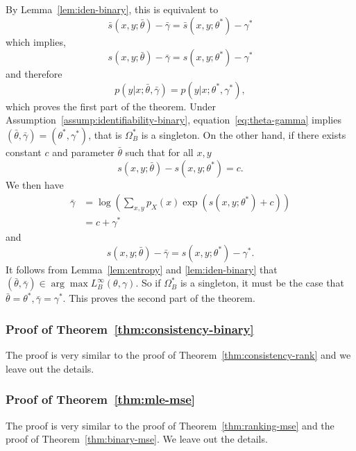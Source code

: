 \documentclass[11pt,a4paper]{article}
\newcommand{\str}[3]{s(#1, #2; #3)}
\newcommand{\ssf}[3]{\bar{s}(#1, #2; #3)}
\begin{document}
By Lemma~\ref{lem:iden-binary}, this is equivalent to 
\begin{equation}
  \ssf{x}{y}{\bar{\theta}} - \bar{\gamma} = \ssf{x}{y}{\theta^*} - \gamma^* 
\label{eq:theta-gamma}
\end{equation}
which implies, 
\begin{equation}
  \str{x}{y}{\bar{\theta}} - \bar{\gamma} = \str{x}{y}{\theta^*} - \gamma^* 
\label{eq:theta-gamma}
\end{equation}
and therefore
\[
p(y|x ; \bar{\theta}, \bar{\gamma}) = p(y|x; \theta^*, \gamma^*),
\]
which proves the first part of the theorem. Under Assumption~\ref{assump:identifiability-binary}, equation~\eqref{eq:theta-gamma} implies $(\bar{\theta}, \bar{\gamma}) = (\theta^*, \gamma^*)$, that is $\Omega_B^*$ is a singleton. On the other hand, if there exists constant $c$ and parameter $\bar{\theta}$ such that for all $x, y$
\[
\str{x}{y}{\bar{\theta}} - \str{x}{y}{\theta^*} = c. 
\]
We then have  
\begin{equation*}
\begin{aligned}
\bar{\gamma} & = \log \left(\sum_{x, y} p_X(x)\exp(\str{x}{y}{\theta^*} + c)\right) \\
 & = c + \gamma^* 
\end{aligned}
\end{equation*}
and  
\[
\str{x}{y}{\bar{\theta}} - \bar{\gamma} = \str{x}{y}{\theta^*} - \gamma^*. 
\]
It follows from Lemma~\ref{lem:entropy} and \ref{lem:iden-binary} that $(\bar{\theta}, \bar{\gamma}) \in\arg\max L_B^\infty(\theta, \gamma)$. So if $\Omega^*_B$ is a singleton, it must be the case that $\bar{\theta} = \theta^*, \bar{\gamma} = \gamma^*$. This proves the second part of the theorem. 




\subsubsection{Proof of Theorem~\ref{thm:consistency-binary}}
\label{sec:pf-consis-binary}
The proof is very similar to the proof of Theorem~\ref{thm:consistency-rank} and we leave out the details. 


\subsubsection{Proof of Theorem~\ref{thm:mle-mse}}
\label{sec:pf-mle-mse}
The proof is very similar to the proof of Theorem~\ref{thm:ranking-mse} and the proof of Theorem~\ref{thm:binary-mse}. We leave out the details. 
\end{document}
